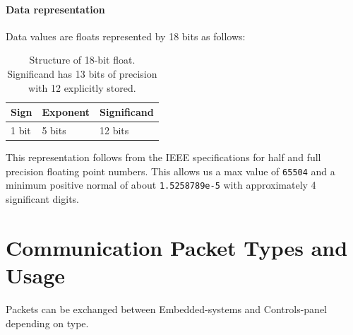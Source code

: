     \paragraph{Data representation}
    \label{par:data-repr}
    Data values are floats represented by 18 bits as follows:
    \begin{table}[H]
        \centering
        \begin{tabular}{@{}lll@{}} \toprule
            Sign & Exponent & Significand\\ \midrule
            1 bit & 5 bits & 12 bits\\ \bottomrule
        \end{tabular}
        \caption{Structure of 18-bit float. Significand has 13 bits of precision with 12 explicitly stored.}
    \end{table}
    This representation follows from the IEEE specifications for half and full precision floating point numbers. This allows us a max value of \texttt{65504} and a minimum positive normal of about \texttt{1.5258789e-5} with approximately 4 significant digits.
    \section{Communication Packet Types and Usage}
    Packets can be exchanged between Embedded-systems and Controls-panel depending on type.
